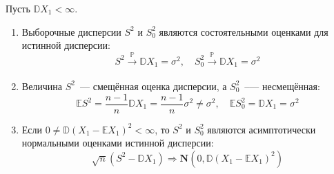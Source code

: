 \begin{thm*}
Пусть $\mathbb{D} X_{1}<\infty$.
\begin{enumerate}
    \item Выборочные дисперсии $S^{2}$ и $S^{2}_0$ являются состоятельными оценками для истинной дисперсии:
    \begin{equation*}
        S^{2} \xrightarrow[]{\mathbb{P}} \mathbb{D} X_{1}=\sigma^{2}, \quad S_{0}^{2} \xrightarrow[]{\mathbb{P}} \mathbb{D} X_{1}=\sigma^{2}
    \end{equation*}
    \item Величина $S^{2}$~--- смещённая оценка дисперсии, а $S^{2}_0$~--— несмещённая:
    \begin{equation*}
        \mathbb{E} S^{2}=\frac{n-1}{n} \mathbb{D} X_{1}=\frac{n-1}{n} \sigma^{2} \neq \sigma^{2}, \quad \mathbb{E} S_{0}^{2}=\mathbb{D} X_{1}=\sigma^{2}
    \end{equation*}
    
    \item Если $0 \neq \mathbb{D}(X_{1}-\mathbb{E}X_{1})^{2}<\infty$, то $S^{2}$ и $S^{2}_0$ являются асимптотически нормальными оценками истинной дисперсии:
    \begin{equation*}
        \sqrt{n}\left(S^{2}-\mathbb{D} X_{1}\right) \Rightarrow \mathbf{N}(0, \mathbb{D}(X_{1}-\mathbb{E} X_{1})^{2})
    \end{equation*}
\end{enumerate}
\end{thm*}

